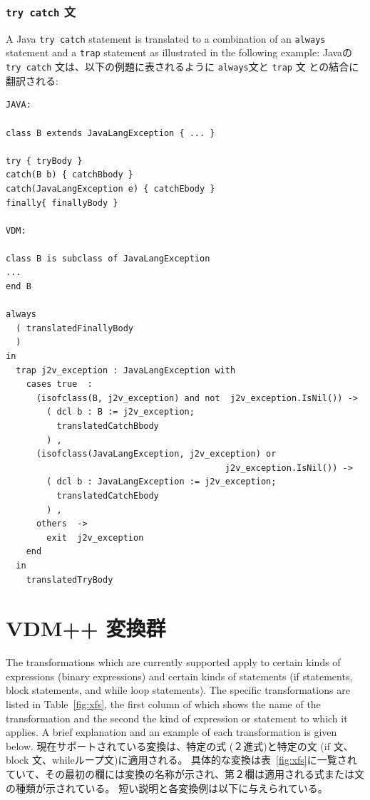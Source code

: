 \documentclass[\pformat,12pt]{jarticle}
\begin{document}
\subsubsection{\texttt{try catch} 文}

A Java \texttt{try catch} statement is translated to a combination of
an \texttt{always} statement and a \texttt{trap} statement as
illustrated in the following example:
Javaの \texttt{try catch} 文は、以下の例題に表されるように \texttt{always}文と \texttt{trap} 文 との結合に翻訳される:

\begin{small}
\begin{verbatim}
JAVA:

class B extends JavaLangException { ... }

try { tryBody }
catch(B b) { catchBbody }
catch(JavaLangException e) { catchEbody }
finally{ finallyBody }

VDM:

class B is subclass of JavaLangException
...
end B

always  
  ( translatedFinallyBody 
  ) 
in  
  trap j2v_exception : JavaLangException with  
    cases true  : 
      (isofclass(B, j2v_exception) and not  j2v_exception.IsNil()) -> 
        ( dcl b : B := j2v_exception;
          translatedCatchBbody 
        ) ,
      (isofclass(JavaLangException, j2v_exception) or 
                                           j2v_exception.IsNil()) -> 
        ( dcl b : JavaLangException := j2v_exception;
          translatedCatchEbody 
        ) ,
      others  -> 
        exit  j2v_exception
    end  
  in  
    translatedTryBody
\end{verbatim}
\end{small}

\newpage
\section{VDM++ 変換群}
\label{xforms}

The transformations which are currently supported apply to certain
kinds of expressions (binary expressions) and certain kinds of
statements (if statements, block statements, and while loop
statements). The specific transformations are listed in
Table~\ref{fig:xfs}, the first column of which shows the 
name of the transformation and the second the kind of expression or
statement to which it applies. A brief explanation and an example of
each transformation is given below.
現在サポートされている変換は、特定の式 (２進式)と特定の文 (if 文、block 文、whileループ文)に適用される。 
具体的な変換は表~\ref{fig:xfs}に一覧されていて、その最初の欄には変換の名称が示され、第２欄は適用される式または文の種類が示されている。
短い説明と各変換例は以下に与えられている。
\end{document}
